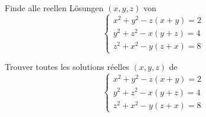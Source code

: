 Finde alle reellen Lösungen $(x,y,z)$ von
\[
\begin{cases}
x^2 + y^2 - z(x+y) = 2\\
y^2+z^2 - x(y+z) = 4\\
z^2+x^2 - y(z+x) = 8
\end{cases}
\]

\bigskip

Trouver toutes les solutions réelles $(x,y,z)$ de
\[
\begin{cases}
x^2 + y^2 - z(x+y) = 2\\
y^2+z^2 - x(y+z) = 4\\
z^2+x^2 - y(z+x) = 8
\end{cases}
\]
